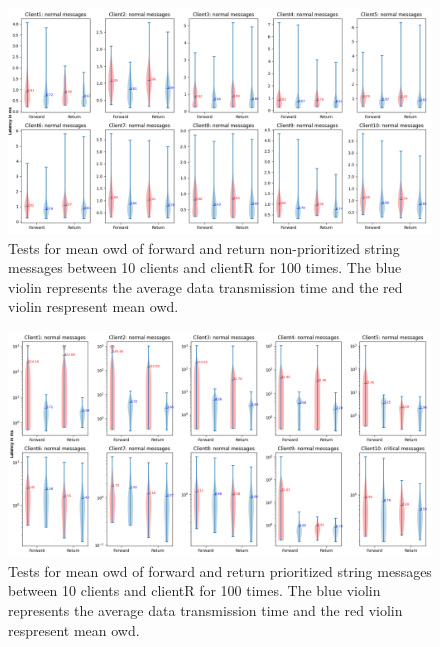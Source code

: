 \begin{figure}
    \centering
    \includegraphics[width=\textheight]{figures/tests/priority_tests/violin_10clients_string_non_priority.png}\hfill 
    \caption{Tests for mean \gls{owd} of forward and return non-prioritized string messages between 10 clients 
    and clientR for 100 times. The blue violin represents the average data transmission time and the red violin 
    respresent mean \gls{owd}.} \label{fig: priority-10clients-a}
\end{figure}
\begin{figure}
    \includegraphics[width=\textheight]{figures/tests/priority_tests/log_violin_10clients_string_priority.png}\hfill 
    \caption{Tests for mean \gls{owd} of forward and return prioritized string messages between 10 clients 
    and clientR for 100 times. The blue violin represents the average data transmission time and the red violin 
    respresent mean \gls{owd}.} \label{fig: priority-10clients-b}
\end{figure}





